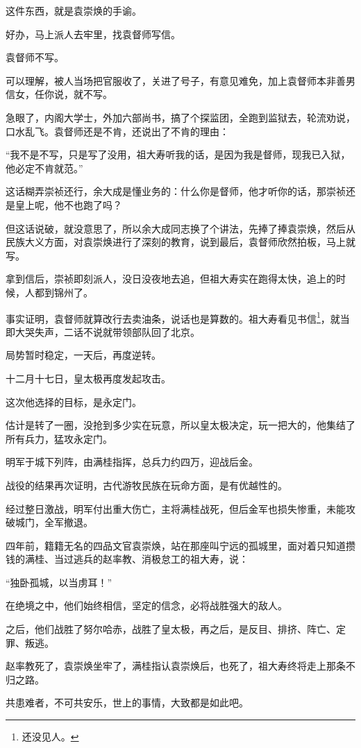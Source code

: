 \begin{multicols}{\theparacolNo}
		这件东西，就是袁崇焕的手谕。

		好办，马上派人去牢里，找袁督师写信。

		袁督师不写。

		可以理解，被人当场把官服收了，关进了号子，有意见难免，加上袁督师本非善男信女，任你说，就不写。

		急眼了，内阁大学士，外加六部尚书，搞了个探监团，全跑到监狱去，轮流劝说，口水乱飞。袁督师还是不肯，还说出了不肯的理由：

		“我不是不写，只是写了没用，祖大寿听我的话，是因为我是督师，现我已入狱，他必定不肯就范。”

		这话糊弄崇祯还行，余大成是懂业务的：什么你是督师，他才听你的话，那崇祯还是皇上呢，他不也跑了吗？

		但这话说破，就没意思了，所以余大成同志换了个讲法，先捧了捧袁崇焕，然后从民族大义方面，对袁崇焕进行了深刻的教育，说到最后，袁督师欣然拍板，马上就写。

		拿到信后，崇祯即刻派人，没日没夜地去追，但祖大寿实在跑得太快，追上的时候，人都到锦州了。

		事实证明，袁督师就算改行去卖油条，说话也是算数的。祖大寿看见书信\footnote{还没见人。}，就当即大哭失声，二话不说就带领部队回了北京。

		局势暂时稳定，一天后，再度逆转。

		十二月十七日，皇太极再度发起攻击。

		这次他选择的目标，是永定门。

		估计是转了一圈，没抢到多少实在玩意，所以皇太极决定，玩一把大的，他集结了所有兵力，猛攻永定门。

		明军于城下列阵，由满桂指挥，总兵力约四万，迎战后金。

		战役的结果再次证明，古代游牧民族在玩命方面，是有优越性的。

		经过整日激战，明军付出重大伤亡，主将满桂战死，但后金军也损失惨重，未能攻破城门，全军撤退。

		四年前，籍籍无名的四品文官袁崇焕，站在那座叫宁远的孤城里，面对着只知道攒钱的满桂、当过逃兵的赵率教、消极怠工的祖大寿，说：

		“独卧孤城，以当虏耳！”

		在绝境之中，他们始终相信，坚定的信念，必将战胜强大的敌人。

		之后，他们战胜了努尔哈赤，战胜了皇太极，再之后，是反目、排挤、阵亡、定罪、叛逃。

		赵率教死了，袁崇焕坐牢了，满桂指认袁崇焕后，也死了，祖大寿终将走上那条不归之路。

		共患难者，不可共安乐，世上的事情，大致都是如此吧。


\end{multicols}
